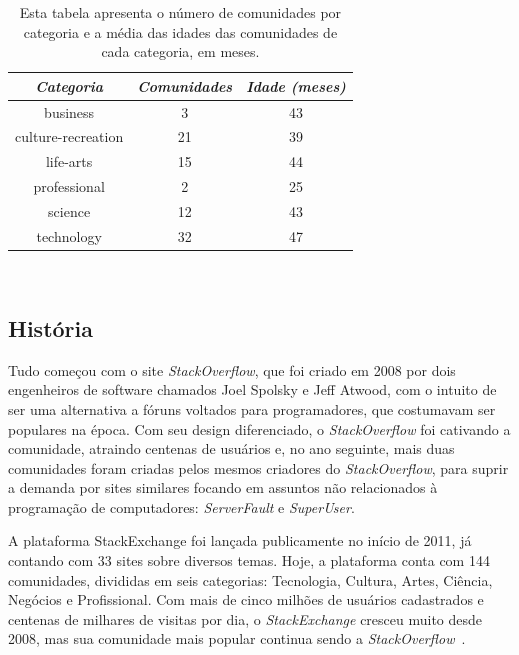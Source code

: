 \begin{table}[h]
\centering
\begin{tabular}{@{}ccc@{}}
\toprule
{\small\textit{Categoria}} & {\small \textit{Comunidades}} & {\small \textit{Idade (meses)}} \\ \midrule
business           & 3  & 43 \\
culture-recreation & 21 & 39 \\
life-arts          & 15 & 44 \\
professional       & 2  & 25 \\
science            & 12 & 43 \\
technology         & 32 & 47 \\ \bottomrule
\end{tabular}
\caption[Resumo das categorias do \emph{StackExchange}]{Esta tabela apresenta o número de comunidades por categoria e a média das idades das comunidades de cada categoria, em meses.}~\label{table:categories}
\end{table}

\subsection{História} %
\label{sub:hist_ria}

Tudo começou com o site \emph{StackOverflow}, que foi criado em 2008 por dois engenheiros de software chamados Joel Spolsky e Jeff Atwood, com o intuito de ser uma alternativa a fóruns voltados para programadores, que costumavam ser populares na época. Com seu design diferenciado, o \emph{StackOverflow} foi cativando a comunidade, atraindo centenas de usuários e, no ano seguinte, mais duas comunidades foram criadas pelos mesmos criadores do \emph{StackOverflow}, para suprir a demanda por sites similares focando em assuntos não relacionados à programação de computadores: \emph{ServerFault} e \emph{SuperUser}.

A plataforma StackExchange foi lançada publicamente no início de 2011, já contando com 33 sites sobre diversos temas. Hoje, a plataforma conta com 144 comunidades, divididas em seis categorias: Tecnologia, Cultura, Artes, Ciência, Negócios e Profissional. Com mais de cinco milhões de usuários cadastrados e centenas de milhares de visitas por dia, o \emph{StackExchange} cresceu muito desde 2008, mas sua comunidade mais popular continua sendo a \emph{StackOverflow}~\cite{wikipedia:stackexchange,wikipedia:stackoverflow}.


